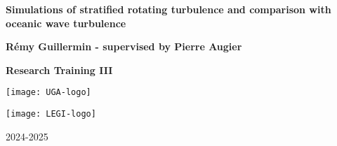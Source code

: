 \documentclass[11pt,twocolumn]{article}
\begin{document}
\pagestyle{fancy}
\fancyhf{}
\fancyhead[LE]{\nouppercase{\rightmark\hfill\leftmark}}
\fancyhead[RO]{\nouppercase{\leftmark\hfill\rightmark}}
\fancyfoot[C]{\thepage}

\begin{titlepage}
   \begin{center}
       \vspace*{1cm}
		
		\Huge
       \textbf{Simulations of stratified rotating turbulence and comparison with oceanic wave turbulence}
            
       \vspace{1.5cm}
       
       \LARGE
       \textbf{Rémy Guillermin - supervised by Pierre Augier}
       
       \vfill
       
       \Large
       \textbf{Research Training III}
            
       \vspace{0.8cm}
     	
       
       \begin{center}
    	\begin{minipage}{0.49\textwidth}
        \centering
        \texttt{[image: UGA-logo]}
    	\end{minipage}
    	\begin{minipage}{0.49\textwidth}
        \centering
        \texttt{[image: LEGI-logo]}
    	\end{minipage}
	    \end{center}
		
		\vspace{0.8cm}
		
       2024-2025
            
   \end{center}
\end{titlepage}
\end{document}
